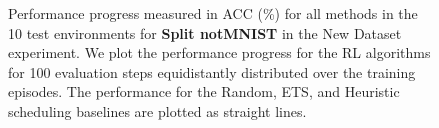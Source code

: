 \begin{figure}[t]
  \centering
  \setlength{\figwidth}{0.26\textwidth}
  \setlength{\figheight}{.14\textheight}
  
  \vspace{-3mm}
  \caption{Performance progress measured in ACC (\%) for all methods in the 10 test environments for {\bf Split notMNIST} in the New Dataset experiment. We plot the performance progress for the RL algorithms for 100 evaluation steps equidistantly distributed over the training episodes. The performance for the Random, ETS, and Heuristic scheduling baselines are plotted as straight lines.  }
  \label{fig:policy_rewards_notmnist_new_dataset_paperD}
  \vspace{-3mm}
\end{figure}




\begin{comment}
\clearpage

\clearpage

\clearpage

\clearpage

\clearpage

\clearpage

\end{comment}


